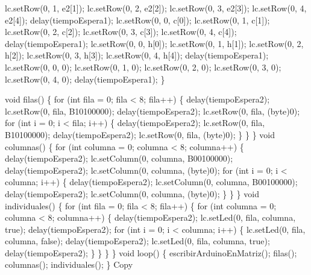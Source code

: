 \documentclass[
]{article}
\newenvironment{Shaded}{}{}
\newcommand{\NormalTok}[1]{#1}
\begin{document}
\begin{Shaded}
\begin{Highlighting}[]
\NormalTok{  lc.setRow(0, 1, e2[1]);}
\NormalTok{  lc.setRow(0, 2, e2[2]);}
\NormalTok{  lc.setRow(0, 3, e2[3]);}
\NormalTok{  lc.setRow(0, 4, e2[4]);}
\NormalTok{  delay(tiempoEspera1);}
\NormalTok{  lc.setRow(0, 0, c[0]);}
\NormalTok{  lc.setRow(0, 1, c[1]);}
\NormalTok{  lc.setRow(0, 2, c[2]);}
\NormalTok{  lc.setRow(0, 3, c[3]);}
\NormalTok{  lc.setRow(0, 4, c[4]);}
\NormalTok{  delay(tiempoEspera1);}
\NormalTok{  lc.setRow(0, 0, h[0]);}
\NormalTok{  lc.setRow(0, 1, h[1]);}
\NormalTok{  lc.setRow(0, 2, h[2]);}
\NormalTok{  lc.setRow(0, 3, h[3]);}
\NormalTok{  lc.setRow(0, 4, h[4]);}
\NormalTok{  delay(tiempoEspera1);}
\NormalTok{  lc.setRow(0, 0, 0);}
\NormalTok{  lc.setRow(0, 1, 0);}
\NormalTok{  lc.setRow(0, 2, 0);}
\NormalTok{  lc.setRow(0, 3, 0);}
\NormalTok{  lc.setRow(0, 4, 0);}
\NormalTok{  delay(tiempoEspera1);}
\NormalTok{\}}

\NormalTok{void filas() \{}
\NormalTok{  for (int fila = 0; fila \textless{} 8; fila++) \{}
\NormalTok{    delay(tiempoEspera2);}
\NormalTok{    lc.setRow(0, fila, B10100000);}
\NormalTok{    delay(tiempoEspera2);}
\NormalTok{    lc.setRow(0, fila, (byte)0);}
\NormalTok{    for (int i = 0; i \textless{} fila; i++) \{}
\NormalTok{      delay(tiempoEspera2);}
\NormalTok{      lc.setRow(0, fila, B10100000);}
\NormalTok{      delay(tiempoEspera2);}
\NormalTok{      lc.setRow(0, fila, (byte)0);}
\NormalTok{    \}}
\NormalTok{  \}}
\NormalTok{\}}
\NormalTok{void columnas() \{}
\NormalTok{  for (int columna = 0; columna \textless{} 8; columna++) \{}
\NormalTok{    delay(tiempoEspera2);}
\NormalTok{    lc.setColumn(0, columna, B00100000);}
\NormalTok{    delay(tiempoEspera2);}
\NormalTok{    lc.setColumn(0, columna, (byte)0);}
\NormalTok{    for (int i = 0; i \textless{} columna; i++) \{}
\NormalTok{      delay(tiempoEspera2);}
\NormalTok{      lc.setColumn(0, columna, B00100000);}
\NormalTok{      delay(tiempoEspera2);}
\NormalTok{      lc.setColumn(0, columna, (byte)0);}
\NormalTok{    \}}
\NormalTok{  \}}
\NormalTok{\}}
\NormalTok{void individuales() \{}
\NormalTok{  for (int fila = 0; fila \textless{} 8; fila++) \{}
\NormalTok{    for (int columna = 0; columna \textless{} 8; columna++) \{}
\NormalTok{      delay(tiempoEspera2);}
\NormalTok{      lc.setLed(0, fila, columna, true);}
\NormalTok{      delay(tiempoEspera2);}
\NormalTok{      for (int i = 0; i \textless{} columna; i++) \{}
\NormalTok{        lc.setLed(0, fila, columna, false);}
\NormalTok{        delay(tiempoEspera2);}
\NormalTok{        lc.setLed(0, fila, columna, true);}
\NormalTok{        delay(tiempoEspera2);}
\NormalTok{      \}}
\NormalTok{    \}}
\NormalTok{  \}}
\NormalTok{\}}
\NormalTok{void loop() \{}
\NormalTok{  escribirArduinoEnMatriz();}
\NormalTok{  filas();}
\NormalTok{  columnas();}
\NormalTok{  individuales();}
\NormalTok{\}}
\NormalTok{Copy}
\end{Highlighting}
\end{Shaded}
\end{document}
